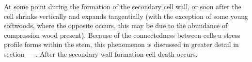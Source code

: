 At some point during the formation of the secondary cell wall, or soon after the
cell shrinks vertically and expands tangentially \cite{Boyd_1972} (with the exception of
some young softwoods, where the opposite occurs, this may be due to
the abundance of compression wood present). Because of the connectedness
between cells a stress profile forms within the stem, this phenomenon is discussed
in greater detail in section ----. After the secondary wall formation cell death
occurs.